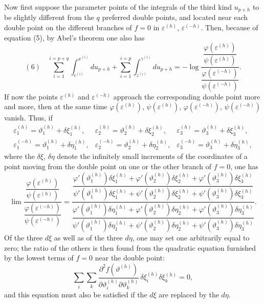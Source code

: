 \documentclass[10pt]{article}
\begin{document}
Now first suppose the parameter points of the integrals of the third kind \(u_{p+h}\) to be slightly different from the \(q\) preferred double points, and located near each double point on the different branches of \(f=0\) in \(\varepsilon^{(h)}\), \(\varepsilon^{(-h)}\). Then, because of equation (5), by Abel's theorem one also has
\[
(6)\quad
\sum_{i=1}^{i=p+q}\int_{c^{(i)}}^{x^{(i)}}du_{p+h}
+\sum_{i=1}^{i=p}\int_{z^{(i)}}^{\gamma^{(i)}}du_{p+h}
=-\log
\frac{\dfrac{\varphi(\varepsilon^{(h)})}{\psi(\varepsilon^{(h)})}}
{\dfrac{\varphi(\varepsilon^{(-h)})}{\psi(\varepsilon^{(-h)})}}.
\]
If now the points \(\varepsilon^{(h)}\) and \(\varepsilon^{(-h)}\) approach the corresponding double point more and more, then at the same time \(\varphi(\varepsilon^{(h)})\), \(\psi(\varepsilon^{(h)})\), \(\varphi(\varepsilon^{(-h)})\), \(\psi(\varepsilon^{(-h)})\) vanish. Thus, if
\[
\begin{array}{lll}
\varepsilon_1^{(h)}=\vartheta_1^{(h)}+\delta\xi_1^{(h)},&
\varepsilon_2^{(h)}=\vartheta_2^{(h)}+\delta\xi_2^{(h)},&
\varepsilon_3^{(h)}=\vartheta_3^{(h)}+\delta\xi_3^{(h)},\\
\varepsilon_1^{(-h)}=\vartheta_1^{(h)}+\delta\eta_1^{(h)},&
\varepsilon_2^{(-h)}=\vartheta_2^{(h)}+\delta\eta_2^{(h)},&
\varepsilon_3^{(-h)}=\vartheta_3^{(h)}+\delta\eta_3^{(h)},
\end{array}
\]
where the \(\delta\xi\), \(\delta\eta\) denote the infinitely small increments of the coordinates of a point moving from the double point on one or the other branch of \(f=0\), one has
\[
\lim
\frac{\dfrac{\varphi(\varepsilon^{(h)})}{\psi(\varepsilon^{(h)})}}
{\dfrac{\varphi(\varepsilon^{(-h)})}{\psi(\varepsilon^{(-h)})}}
=
\frac{\dfrac{\varphi'(\vartheta_1^{(h)})\delta\xi_1^{(h)}+\varphi'(\vartheta_2^{(h)})\delta\xi_2^{(h)}+\varphi'(\vartheta_3^{(h)})\delta\xi_3^{(h)}}
{\psi'(\vartheta_1^{(h)})\delta\xi_1^{(h)}+\psi'(\vartheta_2^{(h)})\delta\xi_2^{(h)}+\psi'(\vartheta_3^{(h)})\delta\xi_3^{(h)}}}
{\dfrac{\varphi'(\vartheta_1^{(h)})\delta\eta_1^{(h)}+\varphi'(\vartheta_2^{(h)})\delta\eta_2^{(h)}+\varphi'(\vartheta_3^{(h)})\delta\eta_3^{(h)}}
{\psi'(\vartheta_1^{(h)})\delta\eta_1^{(h)}+\psi'(\vartheta_2^{(h)})\delta\eta_2^{(h)}+\psi'(\vartheta_3^{(h)})\delta\eta_3^{(h)}}}.
\]
Of the three \(d\xi\) as well as of the three \(d\eta\), one may set one arbitrarily equal to zero; the ratio of the others is then found from the quadratic equation furnished by the lowest terms of \(f=0\) near the double point:
\[
\sum_i\sum_k
\frac{\partial^2f(\vartheta^{(h)})}{\partial\vartheta_i^{(h)}\partial\vartheta_k^{(h)}}
\,\delta\xi_i^{(h)}\delta\xi_k^{(h)}=0,
\]
and this equation must also be satisfied if the \(d\xi\) are replaced by the \(d\eta\).
\end{document}
